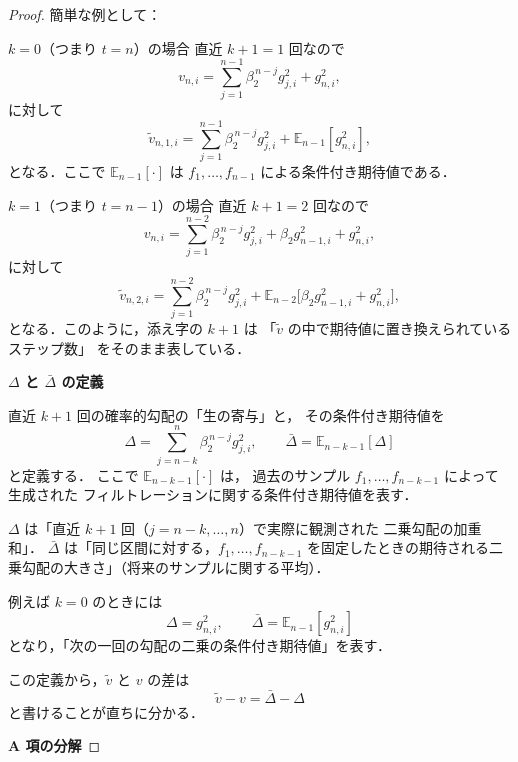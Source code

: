\documentclass[dvipdfmx,a4paper,11pt]{jsarticle}
\begin{document}
\begin{proof}
簡単な例として：

$k = 0$（つまり $t = n$）の場合  
  直近 $k+1=1$ 回なので
  \[
    v_{n,i}
    = \sum_{j=1}^{n-1} \beta_2^{\,n-j} g_{j,i}^2
      + g_{n,i}^2,
  \]
  に対して
  \[
    \tilde{v}_{n,1,i}
    = \sum_{j=1}^{n-1} \beta_2^{\,n-j} g_{j,i}^2
      + \mathbb{E}_{n-1}[g_{n,i}^2],
  \]
  となる．ここで $\mathbb{E}_{n-1}[\cdot]$ は $f_1,\ldots,f_{n-1}$ による条件付き期待値である．

$k = 1$（つまり $t = n-1$）の場合  
  直近 $k+1=2$ 回なので
  \[
    v_{n,i}
    = \sum_{j=1}^{n-2} \beta_2^{\,n-j} g_{j,i}^2
      + \beta_2 g_{n-1,i}^2 + g_{n,i}^2,
  \]
  に対して
  \[
    \tilde{v}_{n,2,i}
    = \sum_{j=1}^{n-2} \beta_2^{\,n-j} g_{j,i}^2
      + \mathbb{E}_{n-2}\!\bigl[ \beta_2 g_{n-1,i}^2 + g_{n,i}^2 \bigr],
  \]
  となる．このように，添え字の $k+1$ は
  「$\tilde{v}$ の中で期待値に置き換えられているステップ数」
  をそのまま表している．

\medskip
\noindent
\textbf{$\Delta$ と $\bar{\Delta}$ の定義}

直近 $k+1$ 回の確率的勾配の「生の寄与」と，
その条件付き期待値を
\begin{equation}
    \Delta
    = \sum_{j=n-k}^{n} \beta_2^{\,n-j} g_{j,i}^2,
    \qquad
    \bar{\Delta}
    = \mathbb{E}_{n-k-1}[\Delta]
    \tag{A.20}
    \label{eq:Delta_barDelta}
\end{equation}
と定義する．
ここで $\mathbb{E}_{n-k-1}[\cdot]$ は，
過去のサンプル $f_1,\ldots,f_{n-k-1}$ によって生成された
フィルトレーションに関する条件付き期待値を表す．

$\Delta$ は「直近 $k+1$ 回（$j=n-k,\ldots,n$）で実際に観測された
  二乗勾配の加重和」．  
$\bar{\Delta}$ は「同じ区間に対する，$f_1,\ldots,f_{n-k-1}$ を固定したときの期待される二乗勾配の大きさ」（将来のサンプルに関する平均）．

例えば $k=0$ のときには
\[
  \Delta = g_{n,i}^2,\qquad
  \bar{\Delta} = \mathbb{E}_{n-1}[g_{n,i}^2]
\]
となり，「次の一回の勾配の二乗の条件付き期待値」を表す．

この定義から，$\tilde{v}$ と $v$ の差は
\[
  \tilde{v} - v = \bar{\Delta} - \Delta
\]
と書けることが直ちに分かる．

\medskip
\noindent
\textbf{A 項の分解}


\end{proof}
\end{document}
